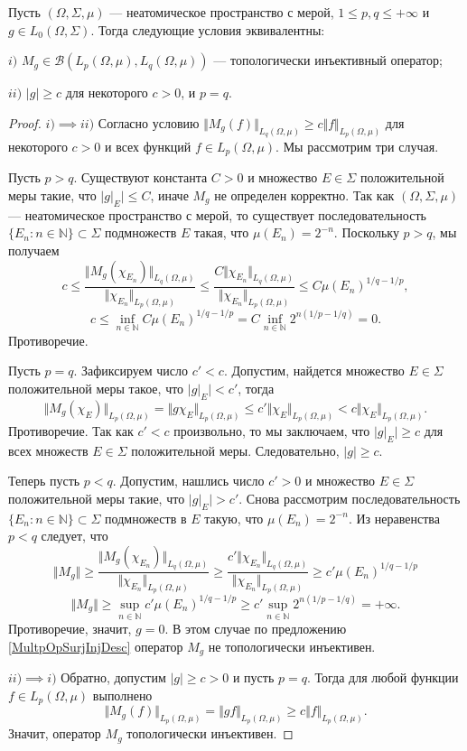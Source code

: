 \begin{proposition}\label{TopInjMultOpCharacOnNonAtomMeasSp} Пусть $(\Omega,\Sigma,\mu)$ --- неатомическое пространство с мерой, $1\leq p,q\leq +\infty$ и $g\in L_0(\Omega,\Sigma)$. Тогда следующие условия эквивалентны:

$i)$ $M_g\in\mathcal{B}(L_p(\Omega,\mu),L_q(\Omega,\mu))$ --- топологически инъективный оператор;

$ii)$ $|g|\geq c$ для некоторого $c>0$, и $p=q$.
\end{proposition}
\begin{proof}
$i)$$\implies$$ ii)$ Согласно условию $\Vert M_g(f)\Vert_{L_q(\Omega,\mu)}\geq c\Vert f\Vert_{L_p(\Omega,\mu)}$ для некоторого $c>0$ и всех функций $f\in L_p(\Omega,\mu)$. Мы рассмотрим три случая.

Пусть $p>q$. Существуют константа $C>0$ и множество $E\in\Sigma$ положительной меры такие, что $|g|_E|\leq C$, иначе $M_g$ не определен корректно. Так как $(\Omega,\Sigma,\mu)$ --- неатомическое пространство с мерой, то существует последовательность $\{E_n:n\in\mathbb{N}\}\subset\Sigma$ подмножеств $E$ такая, что $\mu(E_n)=2^{-n}$. Поскольку $p>q$, мы получаем
$$
c
\leq\frac{\Vert M_g(\chi_{E_n})\Vert_{L_q(\Omega,\mu)}}{\Vert \chi_{E_n}\Vert_{L_p(\Omega,\mu)}}
\leq\frac{C\Vert\chi_{E_n}\Vert_{L_q(\Omega,\mu)}}{\Vert \chi_{E_n}\Vert_{L_p(\Omega,\mu)}}
\leq C\mu(E_n)^{1/q-1/p},
$$
$$
c
\leq\inf_{n\in\mathbb{N}}C\mu(E_n)^{1/q-1/p}
=C\inf_{n\in\mathbb{N}} 2^{n(1/p-1/q)}=0.
$$
Противоречие.

Пусть $p=q$. Зафиксируем число $c'<c$. Допустим, найдется множество $E\in\Sigma$ положительной меры такое, что $|g|_{E}|<c'$, тогда
$$
\Vert M_g(\chi_{E})\Vert_{L_p(\Omega,\mu)}
=\Vert g \chi_{E}\Vert_{L_p(\Omega,\mu)}
\leq c' \Vert \chi_{E}\Vert_{L_p(\Omega,\mu)}
<c\Vert \chi_{E}\Vert_{L_p(\Omega,\mu)}.
$$
Противоречие. Так как $c'<c$ произвольно, то мы заключаем, что $|g|_E|\geq c$ для всех множеств $E\in\Sigma$ положительной меры. Следовательно, $|g|\geq c$.

Теперь пусть $p<q$. Допустим, нашлись число $c'>0$ и множество $E\in\Sigma$ положительной меры такие, что $|g|_E|>c'$. Снова рассмотрим последовательность $\{E_n:n\in\mathbb{N}\}\subset\Sigma$ подмножеств в $E$ такую, что $\mu(E_n)=2^{-n}$. Из неравенства $p<q$ следует, что
$$
\Vert M_g\Vert
\geq\frac{\Vert M_g(\chi_{E_n})\Vert_{L_q(\Omega,\mu)}}{\Vert \chi_{E_n}\Vert_{L_p(\Omega,\mu)}}
\geq\frac{c'\Vert\chi_{E_n}\Vert_{L_q(\Omega,\mu)}}{\Vert \chi_{E_n}\Vert_{L_p(\Omega,\mu)}}
\geq c'\mu(E_n)^{1/q-1/p}
$$
$$
\Vert M_g\Vert
\geq\sup_{n\in\mathbb{N}}c'\mu(E_n)^{1/q-1/p}
\geq c'\sup_{n\in\mathbb{N}}2^{n(1/p-1/q)}
=+\infty.
$$
Противоречие, значит, $g=0$. В этом случае по предложению \ref{MultpOpSurjInjDesc} оператор $M_g$ не топологически инъективен.

$ii)$$\implies$$ i)$ Обратно, допустим $|g|\geq c>0$ и пусть $p=q$. Тогда для любой функции $f\in L_p(\Omega,\mu)$ выполнено
$$
\Vert M_g(f)\Vert_{L_p(\Omega,\mu)}
=\Vert g f\Vert_{L_p(\Omega,\mu)}
\geq c\Vert f\Vert_{L_p(\Omega,\mu)}.
$$
Значит, оператор $M_g$ топологически инъективен.
\end{proof}


